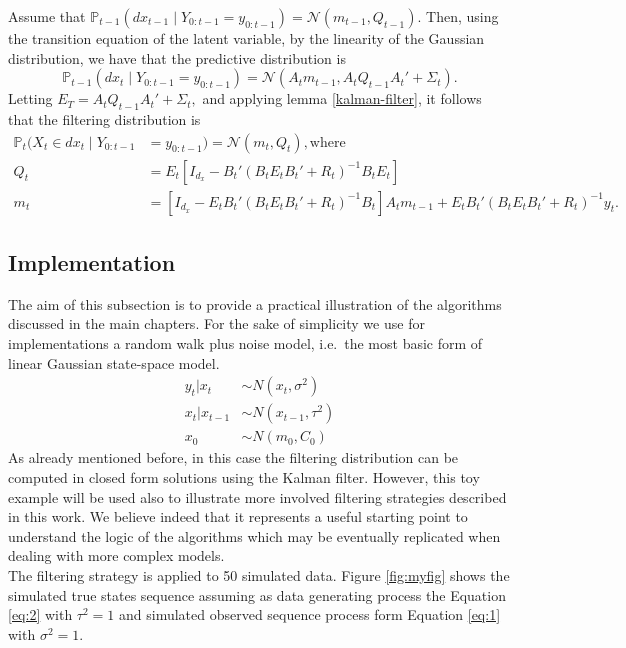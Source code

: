 \documentclass[
]{book}
\theoremstyle{break}
\theoremstyle{nonumberplain}
\begin{document}
Assume that
\(\mathbb{P}_{t-1}(dx_{t-1}\mid Y_{0:t-1}=y_{0:t-1})=\mathcal N(m_{t-1},Q_{t-1}).\)
Then, using the transition equation of the latent variable, by the
linearity of the Gaussian distribution, we have that the predictive
distribution is \begin{equation}
\mathbb{P}_{t-1}(dx_{t}\mid Y_{0:t-1}=y_{0:t-1})=\mathcal N(A_tm_{t-1},A_tQ_{t-1}A_t'+\Sigma_t).
\end{equation} Letting \(E_T=A_tQ_{t-1}A_t'+\Sigma_t,\) and applying
lemma \ref{kalman-filter}, it follows that the filtering distribution is
\begin{align*}
  \mathbb{P}_{t}(X_t\in dx_{t}\mid Y_{0:t-1}&=y_{0:t-1})=\mathcal N(m_t,Q_t), \text{where} \\ Q_t&=E_t[I_{d_x} - B_t'(B_tE_tB_t'+R_t)^{-1} B_tE_t] \\
  m_t &= [I_{d_x} - E_tB_t'(B_tE_tB_t'+R_t)^{-1} B_t]A_tm_{t-1}+E_tB_t'(B_tE_tB_t'+R_t)^{-1}y_t.
\end{align*}

\subsection{Implementation}\label{implementation}

The aim of this subsection is to provide a practical illustration of the
algorithms discussed in the main chapters. For the sake of simplicity we
use for implementations a random walk plus noise model, i.e.~the most
basic form of linear Gaussian state-space model.\\
\begin{align}
y_{t}|x_{t} & \sim N(x_{t},\sigma^{2}) \label{eq:1} \\
x_{t}|x_{t-1} & \sim N(x_{t-1},\tau^{2}) \label{eq:2} \\
x_{0} & \sim N(m_{0},C_{0})
\end{align} As already mentioned before, in this case the filtering
distribution can be computed in closed form solutions using the Kalman
filter. However, this toy example will be used also to illustrate more
involved filtering strategies described in this work. We believe indeed
that it represents a useful starting point to understand the logic of
the algorithms which may be eventually replicated when dealing with more
complex models.\\
The filtering strategy is applied to 50 simulated data. Figure
\ref{fig:myfig} shows the simulated true states sequence assuming as
data generating process the Equation \eqref{eq:2} with \(\tau^{2}=1\)
and simulated observed sequence process form Equation \eqref{eq:1} with
\(\sigma^{2}=1\).
\end{document}
